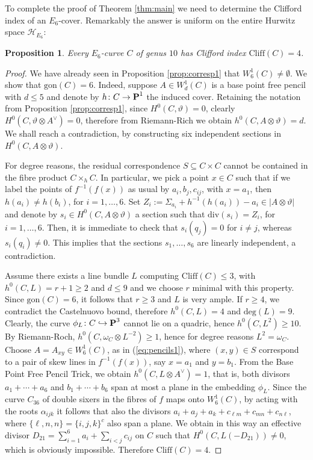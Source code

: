 \documentclass[11pt]{amsart}
\newtheorem{proposition}[theorem]{Proposition}
\theoremstyle{definition}
\def\PP{{\textbf P}}
\def\cH{\mathcal{H}}
\begin{document}
To complete the proof of Theorem \ref{thm:main} we need to determine the Clifford index of an $E_6$-cover. Remarkably the answer is uniform on the entire Hurwitz space $\cH_{E_6}$:

\begin{proposition}\label{prop:cliff_index}
Every $E_6$-curve $C$ of genus $10$ has Clifford index $\mathrm{Cliff}(C)=4$.
\end{proposition}
\begin{proof}
We have already seen in Proposition \ref{prop:corresp1} that $W^1_6(C)\neq \emptyset$. We  show that $\mbox{gon}(C)=6$. Indeed, suppose $A\in W^1_d(C)$ is a base point free pencil with $d\leq 5$ and denote by $h\colon C\rightarrow \PP^1$ the induced cover. Retaining the notation from Proposition \ref{prop:corresp1}, since $H^0(C,\vartheta)=0$, clearly $H^0(C, \vartheta\otimes A^{\vee})=0$, therefore from Riemann-Rich we obtain $h^0(C, A\otimes \vartheta)=d$. We shall reach a contradiction, by constructing six independent sections in $H^0(C, A\otimes \vartheta)$. 

\vskip 4pt

For degree reasons, the residual correspondence $S\subseteq C\times C$ cannot be contained in the fibre product $C\times_h C$. In particular, we pick a point $x\in C$ such that if we label the points of $f^{-1}(f(x))$ as usual by $a_i, b_j, c_{ij}$, with $x=a_1$, then $h(a_i)\neq h(b_i)$, for $i=1, \ldots, 6$. Set $Z_i:=\Sigma_{a_i}+h^{-1}(h(a_i))-a_i\in |A\otimes \vartheta|$ and denote by $s_i\in H^0(C, A\otimes \vartheta)$ a section such that $\mbox{div}(s_i)=Z_i$, for $i=1,\ldots, 6$. Then, it is immediate to check that $s_i(q_j)=0$ for $i\neq j$, whereas $s_i(q_i)\neq 0$. This implies that the sections $s_1, \ldots, s_6$ are linearly independent, a contradiction.

\vskip 4pt

Assume there exists a line bundle $L$ computing $\mbox{Cliff}(C)\leq 3$, with $h^0(C,L)=r+1\geq 2$ and $d\leq 9$ and we choose $r$ minimal with this property.  Since $\mbox{gon}(C)=6$, it follows that $r\geq 3$ and $L$ is very ample. If $r\geq 4$, we contradict the Castelnuovo bound, therefore $h^0(C,L)=4$ and $\mbox{deg}(L)=9$. Clearly, the curve $\phi_L\colon C\hookrightarrow \PP^3$ cannot lie on a quadric, hence $h^0(C,L^2)\geq 10$. By Riemann-Roch, $h^0(C, \omega_C\otimes L^{-2})\geq 1$, hence for degree reasons $L^2=\omega_C$. Choose $A=A_{xy}\in W^1_6(C)$, as in (\ref{eq:pencils1}), where $(x,y)\in S$ correspond to a pair of skew lines in $f^{-1}(f(x))$, say $x=a_1$ and $y=b_1$. From the Base Point Free Pencil Trick, we obtain $h^0(C,L\otimes A^{\vee})=1$, that is, both divisors $a_1+\cdots+a_6$ and $b_1+\cdots+b_6$ span at most a plane in the embedding $\phi_L$. Since the curve $C_{36}$ of double sixers in the fibres of $f$ maps onto $W^1_6(C)$, by acting with the roots $\alpha_{ijk}$ it follows that also the divisors $a_i+a_j+a_k+c_{\ell m}+c_{m n}+ c_{n \ell}$, where $\{\ell, n, n\}=\{i, j,k\}^c$ also span a plane. We obtain in this way an effective divisor $D_{21}=\sum_{i=1}^6 a_i+\sum_{i<j} c_{ij}$ on $C$ such that $H^0(C,L(-D_{21}))\neq 0$, which is obviously impossible.  Therefore $\mbox{Cliff}(C)=4$. 
\end{proof}
\end{document}
